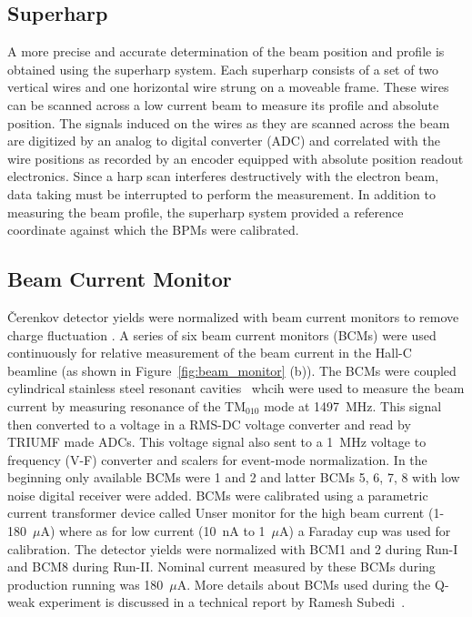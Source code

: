 \subsection{Superharp}%
\label{Superharp}

A more precise and accurate determination of the beam position and profile is obtained using the superharp system. Each superharp consists of a set of two vertical wires and one horizontal wire strung on a moveable frame. These wires can be scanned across a low current beam to measure its profile and absolute position. The signals induced on the wires as they are scanned across the beam are digitized by an analog to digital converter (ADC) and correlated with the wire positions as recorded by an encoder equipped with absolute position readout electronics. Since a harp scan interferes destructively with the electron beam, data taking must be interrupted to perform the measurement. In addition to measuring the beam profile, the superharp system provided a reference coordinate against which the BPMs were calibrated.


\subsection{Beam Current Monitor}%
\label{Beam Current Monitor}

\v{C}erenkov detector yields were normalized with beam current monitors to remove charge fluctuation . A series of six beam current monitors (BCMs) were used continuously for relative measurement of the beam current in the Hall-C beamline (as shown in Figure~\ref{fig:beam_monitor} (b)). The BCMs were coupled cylindrical stainless steel resonant cavities~\cite{bclasie,nur_kaon_thesis} whcih were used to measure the beam current by measuring resonance of the TM$_{010}$ mode at 1497~MHz. This signal then converted to a voltage in a RMS-DC voltage converter and read by TRIUMF made ADCs. This voltage signal also sent to a 1~MHz voltage to frequency (V-F) converter and scalers for event-mode normalization. 
In the beginning only available BCMs were 1 and 2 and latter BCMs 5, 6, 7, 8 with low noise digital receiver were added. 
BCMs were calibrated using a parametric current transformer device called Unser monitor for the high beam current (1-180~$\mu$A) where as for low current (10~nA to 1~$\mu$A) a Faraday cup was used for calibration.
The detector yields were normalized with BCM1 and 2 during Run-I and BCM8 during Run-II. Nominal current measured by these BCMs during production running was 180~$\mu$A. More details about BCMs used during the Q-weak experiment is discussed in a technical report by Ramesh Subedi~\cite{ramesh_bcm}.


